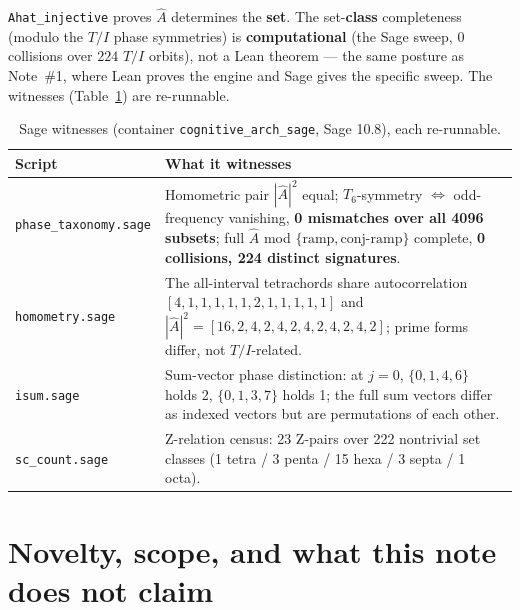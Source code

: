 \documentclass[11pt]{article}
\newcommand{\lean}[1]{\texttt{#1}}
\newcommand{\Ahat}{\hat{A}}
\begin{document}
\lean{Ahat\_injective} proves $\Ahat$ determines the \textbf{set}. The set-\textbf{class} completeness
(modulo the $T/I$ phase symmetries) is \textbf{computational} (the Sage sweep, $0$ collisions over $224$
$T/I$ orbits), not a Lean theorem --- the same posture as Note~\#1, where Lean proves the engine and Sage
gives the specific sweep. The witnesses (Table~\ref{tab:sage}) are re-runnable.

\begin{table}[H]
\centering\small
{}
\begin{tabular}{@{}l p{}@{}}
\toprule
\rowcolor{ctA!22}
\textbf{Script} & \textbf{What it witnesses}\\
\midrule
\lean{phase\_taxonomy.sage} & Homometric pair $|\Ahat|^2$ equal; $T_6$-symmetry $\iff$ odd-frequency vanishing, \textbf{0 mismatches over all 4096 subsets}; full $\Ahat$ mod $\{\text{ramp},\text{conj-ramp}\}$ complete, \textbf{0 collisions, 224 distinct signatures}.\\
\lean{homometry.sage}       & The all-interval tetrachords share autocorrelation $[4,1,1,1,1,1,2,1,1,1,1,1]$ and $|\Ahat|^2=[16,2,4,2,4,2,4,2,4,2,4,2]$; prime forms differ, not $T/I$-related.\\
\lean{isum.sage}            & Sum-vector phase distinction: at $j=0$, $\{0,1,4,6\}$ holds 2, $\{0,1,3,7\}$ holds 1; the full sum vectors differ as indexed vectors but are permutations of each other.\\
\lean{sc\_count.sage}       & Z-relation census: 23 Z-pairs over 222 nontrivial set classes (1 tetra / 3 penta / 15 hexa / 3 septa / 1 octa).\\
\bottomrule
\end{tabular}
\caption{Sage witnesses (container \lean{cognitive\_arch\_sage}, Sage 10.8), each re-runnable.}
\label{tab:sage}
\end{table}

\section{Novelty, scope, and what this note does not claim}\label{sec:novelty}
\end{document}
